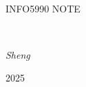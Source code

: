\begin{titlepage}
	\centering
	\vspace*{3cm}
	\hrulefill\\
	\vspace{0.5cm}
	{\scshape\LARGE INFO5990 NOTE\par}
	\vspace{0.5cm}
	\hrulefill\\
	\vspace{1.5cm}

	{\normalsize\itshape Sheng\par}
	
	
	\vspace{14.5cm}
	{\normalsize 2025 \par}

\end{titlepage}